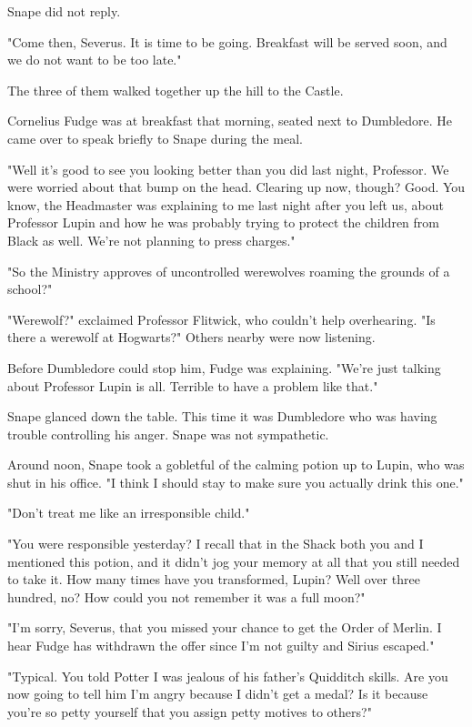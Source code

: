 \documentclass[a4paper,11pt]{article}
\begin{document}
Snape did not reply.

"Come then, Severus. It is time to be going. Breakfast will be served soon, and we do not want to be too late."

The three of them walked together up the hill to the Castle.

Cornelius Fudge was at breakfast that morning, seated next to Dumbledore. He came over to speak briefly to Snape during the meal.

"Well it's good to see you looking better than you did last night, Professor. We were worried about that bump on the head. Clearing up now, though? Good. You know, the Headmaster was explaining to me last night after you left us, about Professor Lupin and how he was probably trying to protect the children from Black as well. We're not planning to press charges."

"So the Ministry approves of uncontrolled werewolves roaming the grounds of a school?"

"Werewolf?" exclaimed Professor Flitwick, who couldn't help overhearing. "Is there a werewolf at Hogwarts?" Others nearby were now listening.

Before Dumbledore could stop him, Fudge was explaining. "We're just talking about Professor Lupin is all. Terrible to have a problem like that."

Snape glanced down the table. This time it was Dumbledore who was having trouble controlling his anger. Snape was not sympathetic.

Around noon, Snape took a gobletful of the calming potion up to Lupin, who was shut in his office. "I think I should stay to make sure you actually drink this one."

"Don't treat me like an irresponsible child."

"You were responsible yesterday? I recall that in the Shack both you and I mentioned this potion, and it didn't jog your memory at all that you still needed to take it. How many times have you transformed, Lupin? Well over three hundred, no? How could you not remember it was a full moon?"

"I'm sorry, Severus, that you missed your chance to get the Order of Merlin. I hear Fudge has withdrawn the offer since I'm not guilty and Sirius escaped."

"Typical. You told Potter I was jealous of his father's Quidditch skills. Are you now going to tell him I'm angry because I didn't get a medal? Is it because you're so petty yourself that you assign petty motives to others?"
\end{document}
